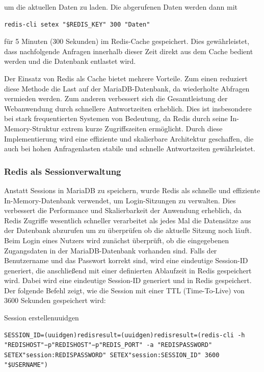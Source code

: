 um die aktuellen Daten zu laden. Die abgerufenen Daten werden dann mit 

\begin{verbatim}
redis-cli setex "$REDIS_KEY" 300 "Daten"
\end{verbatim}

für 5 Minuten (300 Sekunden) im Redis-Cache gespeichert. Dies gewährleistet, dass nachfolgende Anfragen innerhalb dieser Zeit direkt aus dem Cache bedient werden und die Datenbank entlastet wird.


Der Einsatz von Redis als Cache bietet mehrere Vorteile. Zum einen reduziert diese Methode die Last auf der MariaDB-Datenbank, da wiederholte Abfragen vermieden werden. Zum anderen verbessert sich die Gesamtleistung der Webanwendung durch schnellere Antwortzeiten erheblich. Dies ist insbesondere bei stark frequentierten Systemen von Bedeutung, da Redis durch seine In-Memory-Struktur extrem kurze Zugriffszeiten ermöglicht. Durch diese Implementierung wird eine effiziente und skalierbare Architektur geschaffen, die auch bei hohen Anfragenlasten stabile und schnelle Antwortzeiten gewährleistet.

\subsubsection{Redis als Sessionverwaltung}
Anstatt Sessions in MariaDB zu speichern, wurde Redis als schnelle und effiziente In-Memory-Datenbank verwendet, um Login-Sitzungen zu verwalten. Dies verbessert die Performance und Skalierbarkeit der Anwendung erheblich, da Redis Zugriffe wesentlich schneller verarbeitet als jedes Mal die Datensätze aus der Datenbank abzurufen um zu überprüfen ob die aktuelle Sitzung noch läuft. Beim Login eines Nutzers wird zunächst überprüft, ob die eingegebenen Zugangsdaten in der MariaDB-Datenbank vorhanden sind. Falls der Benutzername und das Passwort korrekt sind, wird eine eindeutige Session-ID generiert, die anschließend mit einer definierten Ablaufzeit in Redis gespeichert wird. Dabei wird eine eindeutige Session-ID generiert und in Redis gespeichert. Der folgende Befehl zeigt, wie die Session mit einer TTL (Time-To-Live) von 3600 Sekunden gespeichert wird:

\begin{code}{Session erstellen}{uuidgen}
        \begin{verbatim}
SESSION_ID=(uuidgen)redisresult=(uuidgen)redisresult=(redis-cli -h "REDISHOST"−p"REDISHOST"−p"REDIS_PORT" -a "REDISPASSWORD" SETEX"session:REDISPASSWORD" SETEX"session:SESSION_ID" 3600 "$USERNAME")
  \end{verbatim}
\end{code}


